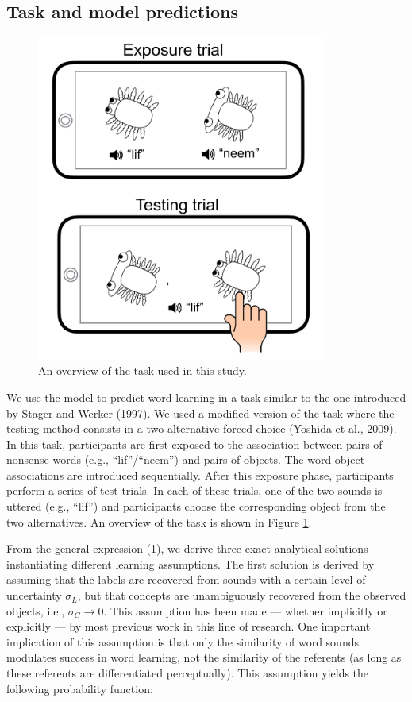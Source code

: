 \documentclass[english,,man,floatsintext]{apa6}
\theoremstyle{definition}
\theoremstyle{definition}
\theoremstyle{definition}
\theoremstyle{remark}
\begin{document}
\subsection{Task and model
predictions}\label{task-and-model-predictions}

\begin{figure}[t]

{\centering \includegraphics[width=3.75in]{figs/task} 

}

\caption{An overview of the task used in this study.}\label{fig:task}
\end{figure}

We use the model to predict word learning in a task similar to the one
introduced by Stager and Werker (1997). We used a modified version of
the task where the testing method consists in a two-alternative forced
choice (Yoshida et al., 2009). In this task, participants are first
exposed to the association between pairs of nonsense words (e.g.,
\enquote{lif}/\enquote{neem}) and pairs of objects. The word-object
associations are introduced sequentially. After this exposure phase,
participants perform a series of test trials. In each of these trials,
one of the two sounds is uttered (e.g., \enquote{lif}) and participants
choose the corresponding object from the two alternatives. An overview
of the task is shown in Figure \ref{fig:task}.

From the general expression (1), we derive three exact analytical
solutions instantiating different learning assumptions. The first
solution is derived by assuming that the labels are recovered from
sounds with a certain level of uncertainty \(\sigma_L\), but that
concepts are unambiguously recovered from the observed objects, i.e.,
\(\sigma_C \rightarrow 0\). This assumption has been made --- whether
implicitly or explicitly --- by most previous work in this line of
research. One important implication of this assumption is that only the
similarity of word sounds modulates success in word learning, not the
similarity of the referents (as long as these referents are
differentiated perceptually). This assumption yields the following
probability function:
\end{document}
